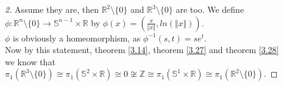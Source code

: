 \begin{proof}[2]
    Assume they are, then $\mathbb{R}^2\setminus\{0\}$ and $\mathbb{R}^3\setminus\{0\}$ are too.
    We define $\phi:\mathbb{R}^n\setminus\{0\}\to\mathbb{S}^{n-1}\times\mathbb{R}$ by $\phi(x)=(\frac{x}{\Vert x\Vert},ln(\Vert x\Vert))$.\\
    $\phi$ is obviously a homeomorphism, as $\phi^{-1}(s,t)=se^t$.\\
    Now by this statement, theorem \ref{3.14}, theorem \ref{3.27} and theorem \ref{3.28}\\
    we know that $\pi_1(\mathbb{R}^3\setminus\{0\})\cong\pi_1(\mathbb{S}^2\times\mathbb{R})\cong0\not\cong\mathbb{Z}\cong\pi_1(\mathbb{S}^1\times\mathbb{R})\cong\pi_1(\mathbb{R}^2\setminus\{0\})$.
\end{proof}